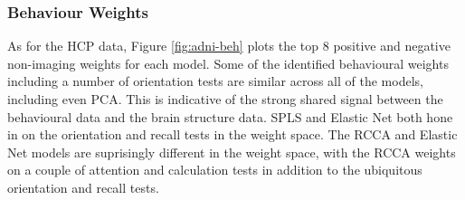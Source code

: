 \subsubsection{Behaviour Weights}

As for the HCP data, Figure \ref{fig:adni-beh} plots the top 8 positive and negative non-imaging \gls{weights} for each model.
Some of the identified behavioural \gls{weights} including a number of orientation tests are similar across all of the models, including even PCA.
This is indicative of the strong shared signal between the behavioural data and the brain structure data.
SPLS and Elastic Net both hone in on the orientation and recall tests in the weight space.
The RCCA and Elastic Net models are suprisingly different in the weight space, with the RCCA \gls{weights} on a couple of attention and calculation tests in addition to the ubiquitous orientation and recall tests.

